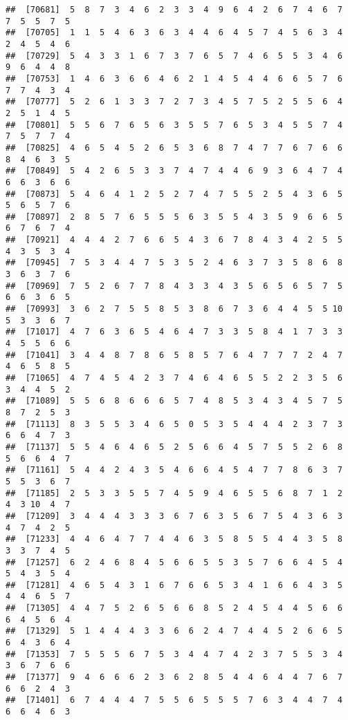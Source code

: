 \documentclass[
]{book}
\begin{document}
\begin{verbatim}
##  [70681]  5  8  7  3  4  6  2  3  3  4  9  6  4  2  6  7  4  6  7  7  5  5  7  5
##  [70705]  1  1  5  4  6  3  6  3  4  4  6  4  5  7  4  5  6  3  4  2  4  5  4  6
##  [70729]  5  4  3  3  1  6  7  3  7  6  5  7  4  6  5  5  3  4  6  9  6  4  4  8
##  [70753]  1  4  6  3  6  6  4  6  2  1  4  5  4  4  6  6  5  7  6  7  7  4  3  4
##  [70777]  5  2  6  1  3  3  7  2  7  3  4  5  7  5  2  5  5  6  4  2  5  1  4  5
##  [70801]  5  5  6  7  6  5  6  3  5  5  7  6  5  3  4  5  5  7  4  7  5  7  7  4
##  [70825]  4  6  5  4  5  2  6  5  3  6  8  7  4  7  7  6  7  6  6  8  4  6  3  5
##  [70849]  5  4  2  6  5  3  3  7  4  7  4  4  6  9  3  6  4  7  4  6  6  3  6  6
##  [70873]  5  4  6  4  1  2  5  2  7  4  7  5  5  2  5  4  3  6  5  5  6  5  7  6
##  [70897]  2  8  5  7  6  5  5  5  6  3  5  5  4  3  5  9  6  6  5  6  7  6  7  4
##  [70921]  4  4  4  2  7  6  6  5  4  3  6  7  8  4  3  4  2  5  5  4  3  5  3  4
##  [70945]  7  5  3  4  4  7  5  3  5  2  4  6  3  7  3  5  8  6  8  3  6  3  7  6
##  [70969]  7  5  2  6  7  7  8  4  3  3  4  3  5  6  5  6  5  7  5  6  6  3  6  5
##  [70993]  3  6  2  7  5  5  8  5  3  8  6  7  3  6  4  4  5  5 10  5  3  3  6  7
##  [71017]  4  7  6  3  6  5  4  6  4  7  3  3  5  8  4  1  7  3  3  4  5  5  6  6
##  [71041]  3  4  4  8  7  8  6  5  8  5  7  6  4  7  7  7  2  4  7  4  6  5  8  5
##  [71065]  4  7  4  5  4  2  3  7  4  6  4  6  5  5  2  2  3  5  6  3  4  4  5  2
##  [71089]  5  5  6  8  6  6  6  5  7  4  8  5  3  4  3  4  5  7  5  8  7  2  5  3
##  [71113]  8  3  5  5  3  4  6  5  0  5  3  5  4  4  4  2  3  7  3  6  6  4  7  3
##  [71137]  5  5  4  6  4  6  5  2  5  6  6  4  5  7  5  5  2  6  8  5  6  6  4  7
##  [71161]  5  4  4  2  4  3  5  4  6  6  4  5  4  7  7  8  6  3  7  5  5  3  6  7
##  [71185]  2  5  3  3  5  5  7  4  5  9  4  6  5  5  6  8  7  1  2  4  3 10  4  7
##  [71209]  3  4  4  4  3  3  3  6  7  6  3  5  6  7  5  4  3  6  3  4  7  4  2  5
##  [71233]  4  4  6  4  7  7  4  4  6  3  5  8  5  5  4  4  3  5  8  3  3  7  4  5
##  [71257]  6  2  4  6  8  4  5  6  6  5  5  3  5  7  6  6  4  5  4  5  4  3  5  4
##  [71281]  4  6  5  4  3  1  6  7  6  6  5  3  4  1  6  6  4  3  5  4  4  6  5  7
##  [71305]  4  4  7  5  2  6  5  6  6  8  5  2  4  5  4  4  5  6  6  6  4  5  6  4
##  [71329]  5  1  4  4  4  3  3  6  6  2  4  7  4  4  5  2  6  6  5  6  4  3  6  4
##  [71353]  7  5  5  5  6  7  5  3  4  4  7  4  2  3  7  5  5  3  4  3  6  7  6  6
##  [71377]  9  4  6  6  6  2  3  6  2  8  5  4  4  6  4  4  7  6  7  6  6  2  4  3
##  [71401]  6  7  4  4  4  7  5  5  6  5  5  5  7  6  3  4  4  7  4  6  6  4  6  3

\end{verbatim}
\end{document}
